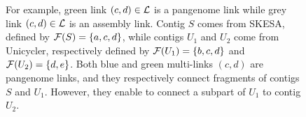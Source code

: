 \begin{figure}[htb]
{    For example, green link \((c, d) \in \mathcal{L}{}\) is a pangenome link while grey link \((c, d) \in \mathcal{L}{}\) is an assembly link.
    Contig \(S\) comes from SKESA, defined by \( \mathcal{F}(S) = \{a, c, d\} \), while contigs \(U_1\) and \(U_2\) come from Unicycler, respectively defined by \( \mathcal{F}(U_1) = \{b, c, d\} \) and \( \mathcal{F}(U_2) = \{d, e\} \).
    Both blue and green multi-links \((c, d)\) are pangenome links, and they respectively connect fragments of contigs \(S\) and \(U_1\).
    However, they enable to connect a subpart of \(U_1\) to contig \(U_2\).
  }\label{fig:panasm_multi-edges}
\end{figure}

